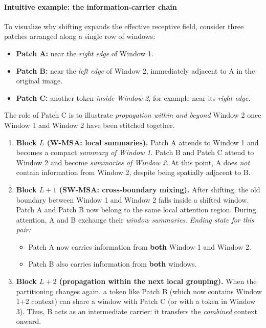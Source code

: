 \paragraph{Intuitive example: the information-carrier chain}
\label{par:chapter18_swin_information_carriers}

\noindent
To visualize why shifting expands the effective receptive field,
consider three patches arranged along a single row of windows:

\begin{itemize}
	\item \textbf{Patch A:} near the \emph{right edge} of Window 1.
	\item \textbf{Patch B:} near the \emph{left edge} of Window 2,
	immediately adjacent to A in the original image.
	\item \textbf{Patch C:} another token \emph{inside Window 2},
	for example near its \emph{right edge}.
\end{itemize}

\noindent
The role of Patch C is to illustrate \emph{propagation within and beyond} Window 2
once Window 1 and Window 2 have been stitched together.

\newpage

\begin{enumerate}
	\item \textbf{Block \(L\) (W-MSA: local summaries).}
	Patch A attends to Window 1 and becomes a compact \emph{summary of Window 1}.
	Patch B and Patch C attend to Window 2 and become \emph{summaries of Window 2}.
	At this point, A does \emph{not} contain information from Window 2,
	despite being spatially adjacent to B.
	
	\item \textbf{Block \(L{+}1\) (SW-MSA: cross-boundary mixing).}
	After shifting, the old boundary between Window 1 and Window 2 falls inside
	a shifted window.
	Patch A and Patch B now belong to the same local attention region.
	During attention, A and B exchange their \emph{window summaries}.
	\emph{Ending state for this pair:}
	\begin{itemize}
		\item Patch A now carries information from \textbf{both} Window 1 and Window 2.
		\item Patch B also carries information from \textbf{both} windows.
	\end{itemize}
	
	\item \textbf{Block \(L{+}2\) (propagation within the next local grouping).}
	When the partitioning changes again,
	a token like Patch B (which now contains Window 1+2 context)
	can share a window with Patch C (or with a token in Window 3).
	Thus, B acts as an intermediate carrier:
	it transfers the \emph{combined} context onward.
\end{enumerate}

